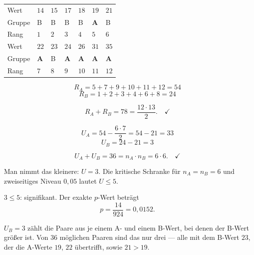 \begin{merksatz}
\begin{center}
{\small
\renewcommand{\arraystretch}{1.3}
\begin{tabular}{@{}P{1.6cm}P{1.4cm}P{1.4cm}P{1.4cm}P{1.4cm}P{1.4cm}P{1.2cm}@{}}
\toprule
Wert & $14$ & $15$ & $17$ & $18$ & $19$ & $21$\\
Gruppe & B & B & B & B & \textbf{A} & B\\
Rang & $1$ & $2$ & $3$ & $4$ & $5$ & $6$\\
\midrule
Wert & $22$ & $23$ & $24$ & $26$ & $31$ & $35$\\
Gruppe & \textbf{A} & B & \textbf{A} & \textbf{A} & \textbf{A} & \textbf{A}\\
Rang & $7$ & $8$ & $9$ & $10$ & $11$ & $12$\\
\bottomrule
\end{tabular}}
\end{center}

\[ R_A = 5+7+9+10+11+12 = 54 \]
\[ R_B = 1+2+3+4+6+8 = 24 \]

\[ R_A + R_B = 78 = \frac{12 \cdot 13}{2} . \quad \checkmark \]

\[ U_A = 54 - \frac{6 \cdot 7}{2} = 54 - 21 = 33 \]
\[ U_B = 24 - 21 = 3 \]

\[ U_A + U_B = 36 = n_A \cdot n_B = 6 \cdot 6 . \quad \checkmark \]

Man nimmt das kleinere: $U = 3$. Die kritische Schranke für $n_A = n_B = 6$ und zweiseitiges Niveau $0{,}05$ lautet $U \le 5$.

$3 \le 5$: signifikant. Der exakte $p$-Wert beträgt
\[ p = \frac{14}{924} = 0{,}0152 . \]

$U_B = 3$ zählt die Paare aus je einem A- und einem B-Wert, bei denen der B-Wert größer ist. Von $36$ möglichen Paaren sind das nur drei --- alle mit dem B-Wert $23$, der die A-Werte $19$, $22$ übertrifft, sowie $21 > 19$.

\begin{center}
\begin{minipage}{0.88\textwidth}
\end{minipage}
\end{center}
\end{merksatz}

